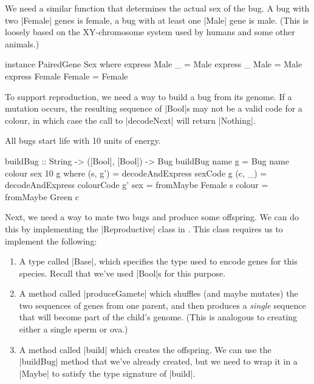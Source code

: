We need a similar function that determines the actual sex of the bug.
A bug with two |Female| genes is female, a bug with at least one 
|Male| gene is male.
(This is loosely based on the XY-chromosome system used by
humans and some other animals.)

\begin{code}
instance PairedGene Sex where
  express Male _        = Male
  express _ Male        = Male
  express Female Female = Female
\end{code} 

To support reproduction, we need a way to build a bug from its genome.
If a mutation occurs, the resulting sequence of |Bool|s may not
be a valid code for a colour, in which case the call to |decodeNext|
will return |Nothing|.

All bugs start life with 10 units of energy.
        
\begin{code}
buildBug :: String -> ([Bool], [Bool]) -> Bug
buildBug name g = Bug name colour sex 10 g
  where (s, g') = decodeAndExpress sexCode g
        (c, _) = decodeAndExpress colourCode g'
        sex = fromMaybe Female s
        colour = fromMaybe Green c
\end{code} 

Next, we need a way to mate two bugs and produce some offspring.
We can do this by implementing the |Reproductive| class in 
.
This class requires us to implement the following:
\begin{enumerate}
\item A type called |Base|, which specifies the type used to encode
genes for this species. Recall that we've used |Bool|s for this purpose.
\item A method called |produceGamete| which shuffles (and maybe mutates)
the two sequences of genes from one parent, 
and then produces a \emph{single} sequence that will become part of the
child's genome.
(This is analogous to creating either a single sperm or ova.)
\item A method called |build| which creates the offspring.
We can use the |buildBug| method that we've already created,
but we need to wrap it in a |Maybe| to satisfy the type signature of
|build|.
\end {enumerate}


